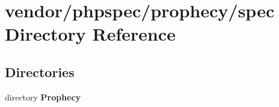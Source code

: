 \section{vendor/phpspec/prophecy/spec Directory Reference}
\label{dir_320d3b1045e2382f22d4c25c3f121b9b}
\subsection*{Directories}
\begin{DoxyCompactItemize}
\item 
directory {\bf Prophecy}
\end{DoxyCompactItemize}
